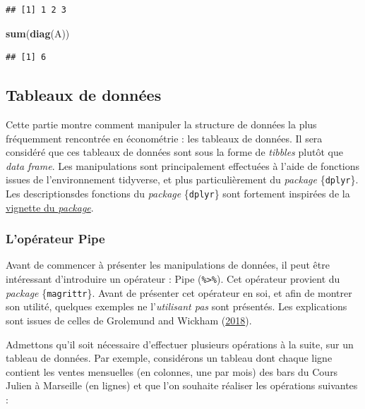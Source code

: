 \documentclass[
  11pt,
]{book}
\newenvironment{Shaded}{\begin{snugshade}}{\end{snugshade}}
\newcommand{\KeywordTok}[1]{\textcolor[rgb]{0.13,0.29,0.53}{\textbf{#1}}}
\newcommand{\NormalTok}[1]{#1}
\numberwithin{equation}{section}
\numberwithin{countremarque}{section}
\begin{document}
\begin{lstlisting}
## [1] 1 2 3
\end{lstlisting}

\begin{Shaded}
\begin{Highlighting}[]
\KeywordTok{sum}\NormalTok{(}\KeywordTok{diag}\NormalTok{(A))}
\end{Highlighting}
\end{Shaded}

\begin{lstlisting}
## [1] 6
\end{lstlisting}

\hypertarget{tableaux_de_donnees}{%
\subsection{Tableaux de données}\label{tableaux_de_donnees}}

Cette partie montre comment manipuler la structure de données la plus fréquemment rencontrée en économétrie : les tableaux de données. Il sera considéré que ces tableaux de données sont sous la forme de \emph{tibbles} plutôt que \emph{data frame}. Les manipulations sont principalement effectuées à l'aide de fonctions issues de l'environnement tidyverse, et plus particulièrement du \emph{package} \{\texttt{dplyr}\}. Les descriptionsdes fonctions du \emph{package} \{\texttt{dplyr}\} sont fortement inspirées de la \href{https://cran.rstudio.com/web/packages/dplyr/vignettes/introduction.html}{vignette du \emph{package}}.

\hypertarget{lopuxe9rateur-pipe}{%
\subsubsection{L'opérateur Pipe}\label{lopuxe9rateur-pipe}}

Avant de commencer à présenter les manipulations de données, il peut être intéressant d'introduire un opérateur : Pipe (\texttt{\%\textgreater{}\%}). Cet opérateur provient du \emph{package} \{\texttt{magrittr}\}. Avant de présenter cet opérateur en soi, et afin de montrer son utilité, quelques exemples ne l'\emph{utilisant pas} sont présentés. Les explications sont issues de celles de Grolemund and Wickham (\protect\hyperlink{ref-grolemund_2018_r}{2018}).

Admettons qu'il soit nécessaire d'effectuer plusieurs opérations à la suite, sur un tableau de données. Par exemple, considérons un tableau dont chaque ligne contient les ventes mensuelles (en colonnes, une par mois) des bars du Cours Julien à Marseille (en lignes) et que l'on souhaite réaliser les opérations suivantes :
\end{document}
